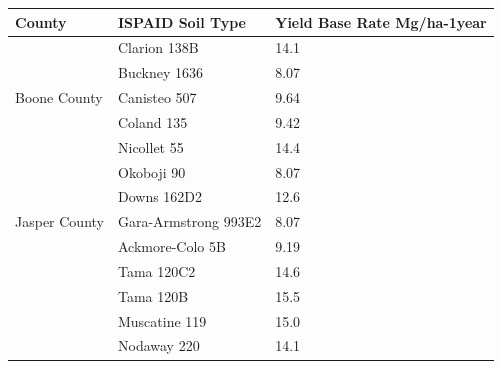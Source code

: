 \documentclass[11pt]{article}
\begin{document}
\begin{itemize}
\begin{table}[H]
\centering
\begin{tabular}{|l|l|l|l|l|l|}
\hline
\multicolumn{2}{|l|}{County}                  & \multicolumn{2}{|l|}{ISPAID Soil Type} & \multicolumn{2}{|l|}{Yield Base Rate Mg/ha-1year} \\ 
\hline
\multicolumn{2}{|l|}{\multirow{5}{*}{Boone County}} & \multicolumn{2}{|l|}{Clarion 138B} & \multicolumn{2}{|l|}{14.1} \\ 
\cline{3-6} 
\multicolumn{2}{|l|}{}                  & \multicolumn{2}{|l|}{Buckney 1636} & \multicolumn{2}{|l|}{8.07} \\ 
\cline{3-6} 
\multicolumn{2}{|l|}{}                  & \multicolumn{2}{|l|}{Canisteo 507} & \multicolumn{2}{|l|}{9.64} \\ 
\cline{3-6} 
\multicolumn{2}{|l|}{}                  & \multicolumn{2}{|l|}{Coland 135} & \multicolumn{2}{|l|}{9.42} \\ 
\cline{3-6} 
\multicolumn{2}{|l|}{}                  & \multicolumn{2}{|l|}{Nicollet 55} & \multicolumn{2}{|l|}{14.4} \\ 
\cline{3-6}
\multicolumn{2}{|l|}{}                  & \multicolumn{2}{|l|}{Okoboji 90} & \multicolumn{2}{|l|}{8.07} \\ 
\hline
\multicolumn{2}{|l|}{\multirow{3}{*}{Jasper County}} & \multicolumn{2}{|l|}{Downs 162D2} & \multicolumn{2}{|l|}{12.6} \\ 
\cline{3-6} 
\multicolumn{2}{|l|}{}                  & \multicolumn{2}{|l|}{Gara-Armstrong 993E2} & \multicolumn{2}{|l|}{8.07} \\ 
\cline{3-6} 
\multicolumn{2}{|l|}{}                  & \multicolumn{2}{|l|}{Ackmore-Colo 5B} & \multicolumn{2}{|l|}{9.19} \\ 
\cline{3-6} 
\multicolumn{2}{|l|}{}                  & \multicolumn{2}{|l|}{Tama 120C2} & \multicolumn{2}{|l|}{14.6} \\ 
\cline{3-6} 
\multicolumn{2}{|l|}{}                  & \multicolumn{2}{|l|}{Tama 120B} & \multicolumn{2}{|l|}{15.5} \\ 
\cline{3-6} 
\multicolumn{2}{|l|}{}                  & \multicolumn{2}{|l|}{Muscatine 119} & \multicolumn{2}{|l|}{15.0} \\ 
\cline{3-6} 
\multicolumn{2}{|l|}{}                  & \multicolumn{2}{|l|}{Nodaway 220} & \multicolumn{2}{|l|}{14.1} \\ 
\hline
\end{tabular}
\end{table}


\end{itemize}
\end{document}
